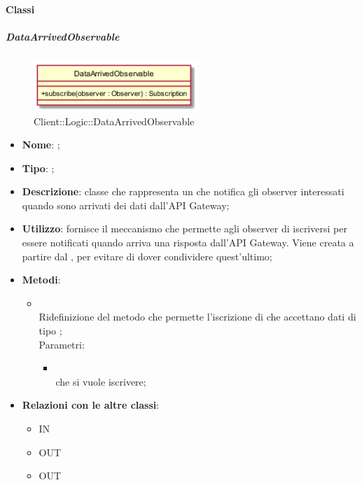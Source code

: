 \paragraph{Classi}
\hypertarget{DataArrivedObservable_label}{\subparagraph{DataArrivedObservable}}
\begin{figure}[h]
	\centering
	\includegraphics[width=0.55\textwidth,height=\textheight,keepaspectratio]{images/ClassDataArrivedObservable.png}
	\caption{Client::Logic::DataArrivedObservable}
\end{figure}
\begin{itemize}
	\item \textbf{Nome}: ;
	\item \textbf{Tipo}: ;
	\item \textbf{Descrizione}: classe che rappresenta un  che notifica gli observer interessati quando sono arrivati dei dati dall'API Gateway;
	\item \textbf{Utilizzo}: fornisce il meccanismo che permette agli observer di iscriversi per essere notificati quando arriva una risposta dall'API Gateway. Viene creata a partire dal , per evitare di dover condividere quest'ultimo;
	\item \textbf{Metodi}:
	\begin{itemize}
		\item[]  \\		Ridefinizione del metodo che permette l'iscrizione di  che accettano dati di tipo ;\\
		Parametri:
		\begin{itemize}
			\item {} \\
			 che si vuole iscrivere;
		\end{itemize}
	\end{itemize}
	\item \textbf{Relazioni con le altre classi}:
	\begin{itemize}
		\item IN \hyperlink{Logic_label}{}
		\item OUT \hyperlink{ApplicationManagerObserver_label}{}
		\item OUT \hyperlink{PlayerObserver_label}{}
	\end{itemize}
\end{itemize}
\FloatBarrier

